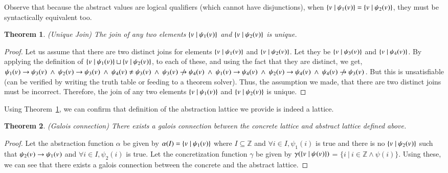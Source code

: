 Observe that because the abstract values are logical qualifiers (which cannot have disjunctions), when $\{v_{}\ |\ \psi_{1}(v_{})\} = \{v_{}\ |\ \psi_{2}(v_{})\}$, they must be syntactically equivalent too.

\newtheorem{theorem}{Theorem}
\begin{theorem}
\label{theo:join}
\emph{(Unique Join)} The join of any two elements $\{v_{}\ |\ \psi_{1}(v_{})\}$ and $\{v_{}\ |\ \psi_{2}(v_{})\}$ is unique. 
\end{theorem}
\begin{proof}
Let us assume that there are two distinct joins for elements $\{v_{}\ |\ \psi_{1}(v_{})\}$ and $\{v_{}\ |\ \psi_{2}(v_{})\}$.
Let they be $\{v_{}\ |\ \psi_{3}(v_{})\}$ and $\{v_{}\ |\ \psi_{4}(v_{})\}$.
By applying the definition of $\{v_{}\ |\ \psi_{1}(v_{})\} \sqcup \{v_{}\ |\ \psi_{2}(v_{})\}$, to each of these, and using the fact that they are distinct, we get, $\pr{}{1} \rightarrow \pr{}{3}\ \land\ \pr{}{2} \rightarrow \pr{}{3}\ \land\ \pr{}{4} \neq \pr{}{3}\ \land\ \pr{}{3} \centernot\rightarrow \pr{}{4}\ \land\ \pr{}{1} \rightarrow \pr{}{4}\ \land\ \pr{}{2} \rightarrow \pr{}{4}\ \land\ \pr{}{4} \centernot\rightarrow \pr{}{3}$.
But this is unsatisfiable (can be verified by writing the truth table or feeding to a theorem solver). 
Thus, the assumption we made, that there are two distinct joins must be incorrect.
Therefore, the join of any two elements $\{v_{}\ |\ \psi_{1}(v_{})\}$ and $\{v_{}\ |\ \psi_{2}(v_{})\}$ is unique.
\end{proof}

Using Theorem~\ref{theo:join}, we can confirm that definition of the abstraction lattice we provide is indeed a lattice.

\begin{theorem}
\label{theo:galois}
\emph{(Galois connection)}
There exists a galois connection between the concrete lattice and abstract lattice defined above.
\end{theorem}
\begin{proof}
Let the abstraction function $\alpha$ be given by $\alpha(I) = \{v_{}\ |\ \psi_{1}(v_{})\}$ where $I \subseteq \mathbb{Z}$ and $\forall i \in I, \psi_1(i)$ is true and there is no $\{v_{}\ |\ \psi_{2}(v_{})\}$ such that $\psi_{2}(v_{}) \rightarrow \psi_{1}(v_{})$ and $\forall i \in I, \psi_2(i)$ is true.
Let the concretization function $\gamma$ be given by $\gamma(\{v_{}\ |\ \psi_{}(v_{})\})$ = $\{ i \ |\ i \in \mathbb{Z} \land \psi(i) \}$.
Using these, we can see that there exists a galois connection between the concrete and the abstract lattice.
\end{proof}
